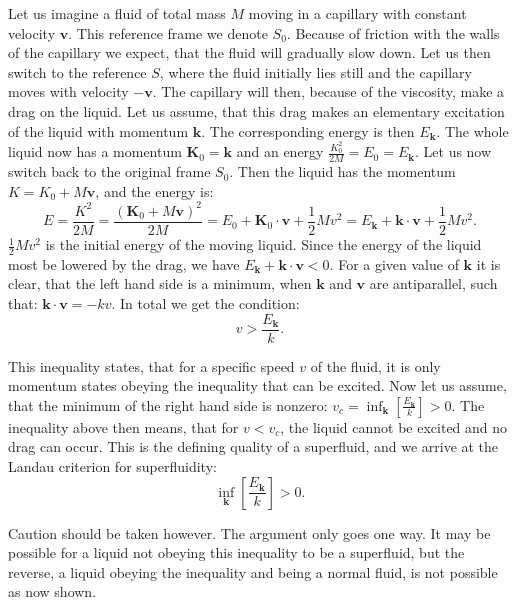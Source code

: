 Let us imagine a fluid of total mass $M$ moving in a capillary with constant velocity $\mathbf{v}$. This reference frame we denote $S_0$. Because of friction with the walls of the capillary we expect, that the fluid will gradually slow down. Let us then switch to the reference $S$, where the fluid initially lies still and the capillary moves with velocity $-\mathbf{v}$. The capillary will then, because of the viscosity, make a drag on the liquid. Let us assume, that this drag makes an elementary excitation of the liquid with momentum $\mathbf{k}$. The corresponding energy is then $E_{\mathbf{k}}$. The whole liquid now has a momentum $\mathbf{K}_0 = \mathbf{k}$ and an energy $\frac{K_0^2}{2M} = E_0 = E_{\mathbf{k}}$. Let us now switch back to the original frame $S_0$. Then the liquid has the momentum $K = K_0 + M\mathbf{v}$, and the energy is:
\begin{equation}
E = \frac{K^2}{2M} = \frac{(\mathbf{K}_0 + M\mathbf{v})^2}{2M} = E_0 + \mathbf{K}_0\cdot \mathbf{v} + \frac{1}{2}Mv^2 = E_{\mathbf{k}} + \mathbf{k} \cdot \mathbf{v} + \frac{1}{2}Mv^2 . \nonumber
\end{equation}
$\frac{1}{2}Mv^2$ is the initial energy of the moving liquid. Since the energy of the liquid most be lowered by the drag, we have $E_{\mathbf{k}} + \mathbf{k} \cdot \mathbf{v} < 0 $. For a given value of $\mathbf{k}$ it is clear, that the left hand side is a minimum, when $\mathbf{k}$ and $\mathbf{v}$ are antiparallel, such that: $ \mathbf{k}\cdot \mathbf{v} = -kv$. In total we get the condition:
\begin{equation}
v > \frac{E_{\mathbf{k}}}{k}. \nonumber
\end{equation}

This inequality states, that for a specific speed $v$ of the fluid, it is only momentum states obeying the inequality that can be excited. Now let us assume, that the minimum of the right hand side is nonzero: $v_c = \inf_{\mathbf{k}}\left[\frac{E_{\mathbf{k}}}{k} \right] > 0$. The inequality above then means, that for $v < v_c$, the liquid cannot be excited and no drag can occur. This is the defining quality of a superfluid, and we arrive at the Landau criterion for superfluidity:
\begin{equation}
\inf_{\mathbf{k}}\left[\frac{E_{\mathbf{k}}}{k} \right] > 0.
\end{equation}

Caution should be taken however. The argument only goes one way. It may be possible for a liquid not obeying this inequality to be a superfluid, but the reverse, a liquid obeying the inequality and being a normal fluid, is not possible as now shown. 

